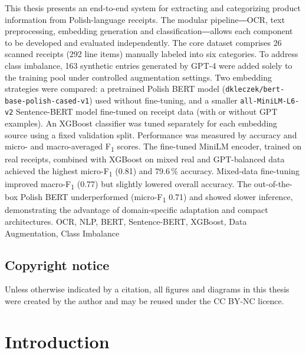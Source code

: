 \documentclass{SGGW-thesis-EN}
\begin{document}
{This thesis presents an end-to-end system for extracting and categorizing product information from Polish-language receipts. 
The modular pipeline―OCR, text preprocessing, embedding generation and classification―allows each component to be developed and evaluated independently. 
The core dataset comprises 26 scanned receipts (292 line items) manually labeled into six categories. 
To address class imbalance, 163 synthetic entries generated by GPT-4 were added solely to the training pool under controlled augmentation settings.
Two embedding strategies were compared: a pretrained Polish BERT model (\texttt{dkleczek/bert-base-polish-cased-v1}) used without fine-tuning, 
and a smaller \texttt{all-MiniLM-L6-v2} Sentence-BERT model fine-tuned on receipt data (with or without GPT examples). 
An XGBoost classifier was tuned separately for each embedding source using a fixed validation split. 
Performance was measured by accuracy and micro- and macro-averaged F\textsubscript{1} scores.
The fine-tuned MiniLM encoder, trained on real receipts, combined with XGBoost on mixed real and GPT-balanced data achieved the highest 
micro-F\textsubscript{1} (0.81) and 79.6\,\% accuracy. Mixed-data fine-tuning improved macro-F\textsubscript{1} (0.77) but slightly lowered overall accuracy. 
The out-of-the-box Polish BERT underperformed (micro-F\textsubscript{1} 0.71) and showed slower inference, 
demonstrating the advantage of domain-specific adaptation and compact architectures.}
{OCR, NLP, BERT, Sentence-BERT, XGBoost, Data Augmentation, Class Imbalance}


\tableofcontents

\section*{Copyright notice}
\noindent
Unless otherwise indicated by a citation, all figures and diagrams in this thesis were created by the author and may be reused under the CC BY-NC licence.


\startchapterfromoddpage %

\chapter{Introduction}
\end{document}
